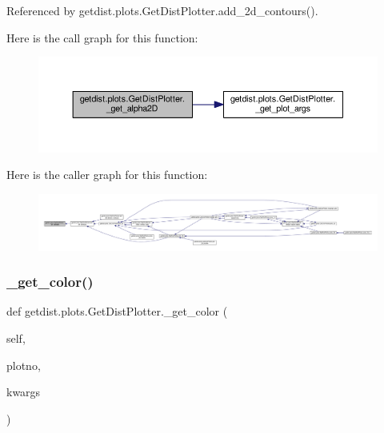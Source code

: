 Referenced by getdist.\+plots.\+Get\+Dist\+Plotter.\+add\+\_\+2d\+\_\+contours().

Here is the call graph for this function\+:
\nopagebreak
\begin{figure}[H]
\begin{center}
\leavevmode
\includegraphics[width=350pt]{classgetdist_1_1plots_1_1GetDistPlotter_a5814b23cb1d375a904161d0a7b2b78b9_cgraph}
\end{center}
\end{figure}
Here is the caller graph for this function\+:
\nopagebreak
\begin{figure}[H]
\begin{center}
\leavevmode
\includegraphics[width=350pt]{classgetdist_1_1plots_1_1GetDistPlotter_a5814b23cb1d375a904161d0a7b2b78b9_icgraph}
\end{center}
\end{figure}
\mbox{\label{classgetdist_1_1plots_1_1GetDistPlotter_afe806ee81dad4b9d7c3f2c5e55846b95}} 
\subsubsection{\texorpdfstring{\+\_\+get\+\_\+color()}{\_get\_color()}}
{\footnotesize\ttfamily def getdist.\+plots.\+Get\+Dist\+Plotter.\+\_\+get\+\_\+color (\begin{DoxyParamCaption}\item[{}]{self,  }\item[{}]{plotno,  }\item[{}]{kwargs }\end{DoxyParamCaption})\hspace{0.3cm}{\ttfamily [private]}}

